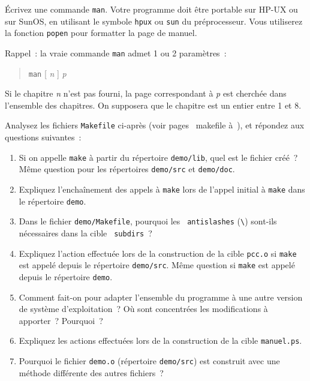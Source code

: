 Écrivez une commande {\tt man}. Votre programme doit être portable
sur HP-UX ou sur SunOS, en utilisant le symbole {\tt hpux} ou {\tt sun}
du préprocesseur. Vous utiliserez la fonction {\tt popen} pour formatter
la page de manuel.

Rappel~: la vraie commande  {\tt man} admet 1 ou 2 paramètres~:

\begin {quote}
    {\tt man} [ {\em n} ] {\em p}
\end {quote}

Si le chapitre {\em n} n'est pas fourni, la page correspondant à {\em p}
est cherchée dans l'ensemble des chapitres. On supposera que le chapitre
est un entier entre 1 et 8.


\question

Analysez les fichiers {\tt Makefile} ci-après (voir pages~\pageref
{makefile} à~\pageref {makefile-fin}), et répondez aux questions
suivantes~:

\begin {enumerate}
    \item Si on appelle {\tt make} à partir du répertoire {\tt demo/lib},
	quel est le fichier créé~? Même question pour les répertoires
	{\tt demo/src} et {\tt demo/doc}.

    \item Expliquez l'enchaînement des appels à {\tt make} lors de
	l'appel initial à {\tt make} dans le répertoire {\tt demo}.

    \item Dans le fichier {\tt demo/Makefile}, pourquoi les {\tt
	antislashes} (\verb:\:) sont-ils nécessaires dans la cible {\tt
	subdirs}~?

    \item Expliquez l'action effectuée lors de la construction de la
	cible {\tt pcc.o} si {\tt make} est appelé depuis le répertoire
	{\tt demo/src}. Même question si {\tt make} est appelé depuis le
	répertoire {\tt demo}.

    \item Comment fait-on pour adapter l'ensemble du programme à une
	autre version de système d'exploitation~? Où sont concentrées
	les modifications à apporter~? Pourquoi~?

    \item Expliquez les actions effectuées lors de la construction de la
	cible {\tt manuel.ps}.

    \item Pourquoi le fichier {\tt demo.o} (répertoire {\tt demo/src}) est
	construit avec une méthode différente des autres fichiers~?

\end {enumerate}



